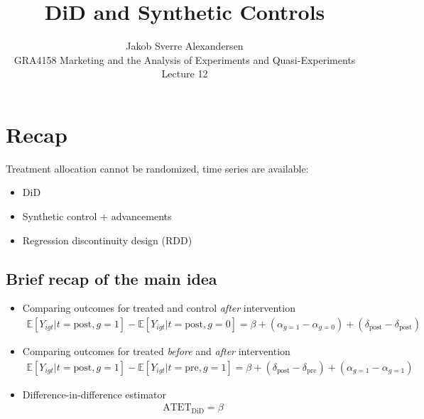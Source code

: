 \documentclass[10pt]{article}
\begin{document}
 
\title{DiD and Synthetic Controls}
\author{Jakob Sverre Alexandersen\\
GRA4158 Marketing and the Analysis of Experiments and Quasi-Experiments\\
Lecture 12}
\maketitle

\tableofcontents
\newpage
\section{Recap}

Treatment allocation cannot be randomized, time series are available: 
\begin{itemize}
    \item DiD 
    \item Synthetic control + advancements
    \item Regression discontinuity design (RDD)
\end{itemize}

\subsection{Brief recap of the main idea}
\begin{itemize}
    \item Comparing outcomes for treated and control \textit{after} intervention 
    \begin{gather*}
        \mathbb{E}[Y_{igt}|t = \text{post}, g = 1] - \mathbb{E}[Y_{igt}|t = \text{post}, g = 0] = \beta + (\alpha_{g = 1} - \alpha_{g = 0}) + (\delta_{\text{post}} - \delta_{\text{post}})
    \end{gather*}
    \item Comparing outcomes for treated \textit{before} and \textit{after} intervention 
    \begin{gather*}
        \mathbb{E}[Y_{igt}|t = \text{post}, g = 1] - \mathbb{E}[Y_{igt}|t = \text{pre}, g = 1] = \beta + (\delta_{\text{post}} - \delta_{\text{pre}}) + (\alpha_{g = 1} - \alpha_{g = 1})
    \end{gather*}
    \item Difference-in-difference estimator
    \begin{gather*}
        \text{ATET}_{\text{DiD}} = \beta 
    \end{gather*}
\end{itemize}
\end{document}
